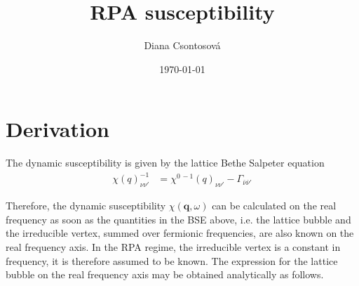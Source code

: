 \documentclass[preprint,prb,amsmath,superscriptaddress,showpacs]{revtex4}
\newcommand{\bq}{\mathbf{q}}
\begin{document}
\title{RPA susceptibility}

\author{Diana Csontosová}

\date{\today}


\section{Derivation}


The dynamic susceptibility is given by the lattice Bethe Salpeter equation
\begin{equation*}
  \begin{split}
    \chi(q)_{\nu\nu'}^{-1} &= \chi^{0 \, -1}(q)_{\nu\nu'} - \Gamma_{\bar{\nu}\bar{\nu}'}
  \end{split}
\end{equation*}

Therefore, the dynamic susceptibility $\chi(\bq, \omega)$ can be calculated on the real
frequency as soon as the quantities in the BSE above, i.e. the lattice bubble and the
irreducible vertex, summed over fermionic frequencies, are also known
on the real frequency axis. In the RPA regime, the irreducible vertex
is a constant in frequency, it is therefore assumed to be known. The
expression for the lattice bubble on the real frequency axis may be
obtained analytically as follows.
\end{document}
